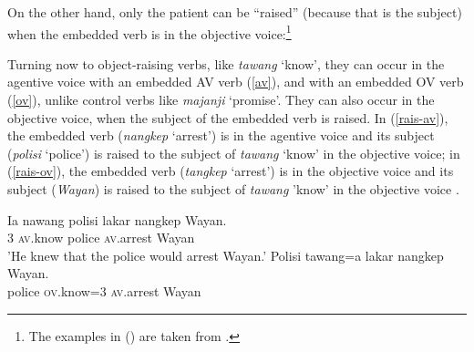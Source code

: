 On the other hand, only the patient can be ``raised'' (because that is the subject) when the embedded verb is in the objective voice:\footnote{
The examples in () are taken from .
}

\eal
{}
\zl


Turning now to object-raising verbs, like \emph{tawang} `know',  they can occur in the agentive
voice with an embedded AV verb (\ref{av}), and with an embedded OV verb (\ref{ov}), unlike control
verbs like \emph{majanji} `promise'. 
They can also occur in the objective voice, when the subject of the embedded verb is raised.  In
(\ref{rais-av}), the embedded verb (\emph{nangkep} `arrest') is in the agentive voice and its
subject (\emph{polisi} `police') is raised to the subject of \emph{tawang} `know' in the objective
voice; in (\ref{rais-ov}), the embedded verb (\emph{tangkep} `arrest') is in the objective voice and
its subject (\emph{Wayan}) is raised to the subject of 
\emph{tawang} 'know' in the objective voice \citep[ex 23]{WechslerandArka1998}.

\eal
\ex 
\label{av}
\gll Ia nawang          polisi lakar  nangkep            Wayan. \\
     3 \textsc{av}.know police \FUT{} \textsc{av}.arrest Wayan \\
\glt 'He knew that the police would arrest Wayan.'
\ex
\label{rais-av} 
\gll Polisi tawang=a           lakar  nangkep            Wayan. \\
     police \textsc{ov}.know=3 \FUT{} \textsc{av}.arrest Wayan\\

